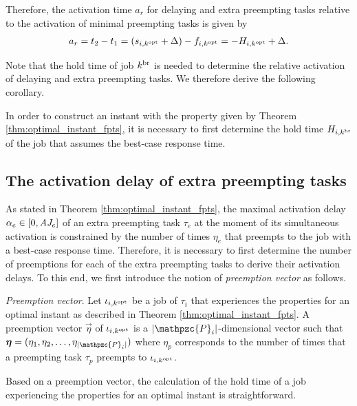Therefore, the activation time $a_r$ for delaying and extra preempting tasks relative to the activation of minimal preempting tasks is given by
\begin{align} \label{eqn:relative_activation_extra_delaying}
a_r = t_2 - t_1 = (s_{i,k^{\rm{opt}}}+\Delta) - f_{i,k^{\rm{opt}}} = -H_{i,k^{\rm{opt}}}+\Delta.
\end{align}

Note that the hold time of job $k^{\rm{br}}$ is needed to determine the relative activation of delaying and extra preempting tasks. We therefore derive the following corollary.
\begin{corollary} \label{cor:hold_time_dor_optimal_instant}
	In order to construct an instant with the property given by Theorem \ref{thm:optimal_instant_fpts}, it is necessary to first determine the hold time $H_{i,k^{\rm{br}}}$ of the job that assumes the best-case response time.
\end{corollary}

\fi

\subsection{The activation delay of extra preempting tasks}



As stated in Theorem \ref{thm:optimal_instant_fpts}, the maximal activation delay $\alpha_e\in [0,\mbox{\it AJ}_e]$ of an extra preempting task $\tau_e$ at the moment of its simultaneous activation is constrained by the number of times $\eta_e$ that preempts to the job with a best-case response time. Therefore, it is necessary to first determine the number of preemptions for each of the extra preempting tasks to derive their activation delays. To this end, we first introduce the notion of \textit{preemption vector} as follows.

\begin{definition}
	\textit{Preemption vector}.
	Let $\iota_{i,k^{\rm{opt}}}$ be a job of $\tau_i$ that experiences the properties for an optimal instant as described in Theorem \ref{thm:optimal_instant_fpts}. A preemption vector $\vec{\eta}$ of $\iota_{i,k^{\rm{opt}}}$ is a $|\mathpzc{P}_i|$-dimensional vector such that $\vec{\eta}=(\eta_1, \eta_2,\dots,\eta_{|\mathpzc{P}_i|})$ where $\eta_p$ corresponds to the number of times that a preempting task $\tau_p$ preempts to $\iota_{i,k^{\rm{opt}}}$.
\end{definition}

Based on a preemption vector, the calculation of the hold time of a job experiencing the properties for an optimal instant is straightforward.

